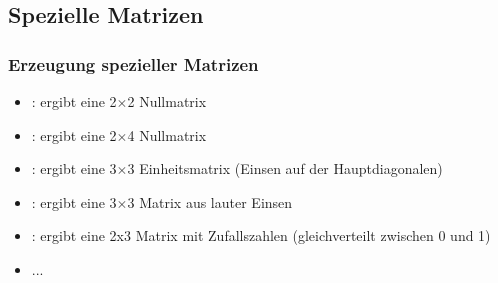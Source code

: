     \subsection{Spezielle Matrizen}
    \begin{frame}
        \frametitle{Erzeugung spezieller Matrizen}
        \begin{itemize}
            \item {}: ergibt eine 2$\times$2 Nullmatrix
            \item {}: ergibt eine 2$\times$4 Nullmatrix
            \item {}: ergibt eine 3$\times$3 Einheitsmatrix (Einsen auf der Hauptdiagonalen)
            \item {}: ergibt eine 3$\times$3 Matrix aus lauter Einsen
            \item {}: ergibt eine 2x3 Matrix mit Zufallszahlen (gleichverteilt zwischen 0 und 1)
            \item ...
        \end{itemize}
    \end{frame}

